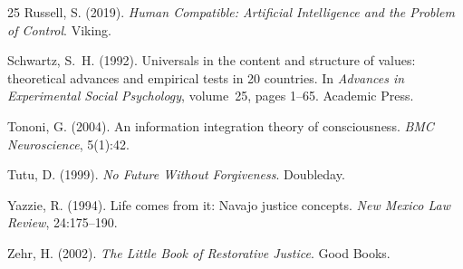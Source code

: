 \documentclass[11pt,a4paper]{article}
\begin{document}
\begin{thebibliography}{25}
Russell, S. (2019).
\newblock \emph{Human Compatible: Artificial Intelligence and the Problem of Control}.
\newblock Viking.

Schwartz, S.~H. (1992).
\newblock Universals in the content and structure of values: theoretical advances and empirical tests in 20 countries.
\newblock In \emph{Advances in Experimental Social Psychology}, volume~25, pages 1--65. Academic Press.

Tononi, G. (2004).
\newblock An information integration theory of consciousness.
\newblock \emph{BMC Neuroscience}, 5(1):42.

Tutu, D. (1999).
\newblock \emph{No Future Without Forgiveness}.
\newblock Doubleday.

Yazzie, R. (1994).
\newblock Life comes from it: Navajo justice concepts.
\newblock \emph{New Mexico Law Review}, 24:175--190.

Zehr, H. (2002).
\newblock \emph{The Little Book of Restorative Justice}.
\newblock Good Books.

\end{thebibliography}
\end{document}
